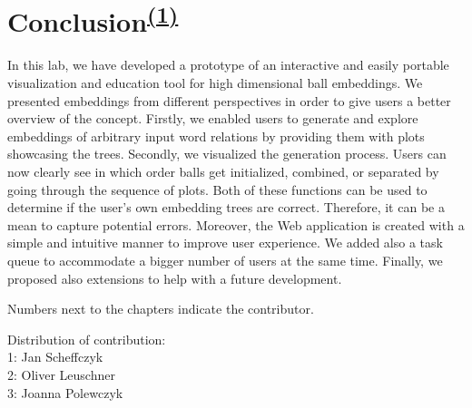 \section[Conclusion]{Conclusion\textsuperscript{\hyperref[Jan]{(1)}}}
In this lab, we have developed a prototype of an interactive and easily portable visualization and education tool for high dimensional ball embeddings. We presented embeddings from different perspectives in order to give users a better overview of the concept. Firstly, we enabled users to generate and explore embeddings of arbitrary input word relations by providing them with plots showcasing the trees. Secondly, we visualized the generation process. Users can now clearly see in which order balls get initialized, combined, or separated by going through the sequence of plots. Both of these functions can be used to determine if the user's own embedding trees are correct. Therefore, it can be a mean to capture potential errors. Moreover, the Web application is created with a simple and intuitive manner to improve user experience. We added also a task queue to accommodate a bigger number of users at the same time. Finally, we proposed also extensions to help with a future development. 


\newpage

Numbers next to the chapters indicate the contributor.
\vspace{0.5in}

Distribution of contribution:\\
1: Jan Scheffczyk \label{Jan}\\
2: Oliver Leuschner \label{Oliver}\\
3: Joanna Polewczyk \label{Joanna}\\


